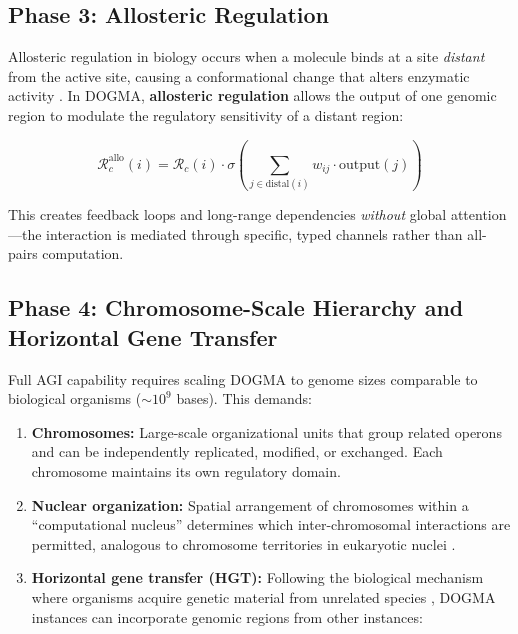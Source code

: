 \subsection{Phase 3: Allosteric Regulation}
\label{sec:allosteric}

Allosteric regulation in biology occurs when a molecule binds at a site \emph{distant} from the active site, causing a conformational change that alters enzymatic activity \citep{monod1965}. In DOGMA, \textbf{allosteric regulation} allows the output of one genomic region to modulate the regulatory sensitivity of a distant region:

\begin{equation}
\mathcal{R}_c^{\text{allo}}(i) = \mathcal{R}_c(i) \cdot \sigma\!\left(\sum_{j \in \text{distal}(i)} w_{ij} \cdot \text{output}(j)\right)
\label{eq:allosteric}
\end{equation}

This creates feedback loops and long-range dependencies \emph{without} global attention---the interaction is mediated through specific, typed channels rather than all-pairs computation.

\subsection{Phase 4: Chromosome-Scale Hierarchy and Horizontal Gene Transfer}
\label{sec:chromosome}

Full AGI capability requires scaling DOGMA to genome sizes comparable to biological organisms ($\sim\!10^9$ bases). This demands:

\begin{enumerate}[leftmargin=1.8em]
  \item \textbf{Chromosomes:} Large-scale organizational units that group related operons and can be independently replicated, modified, or exchanged. Each chromosome maintains its own regulatory domain.

  \item \textbf{Nuclear organization:} Spatial arrangement of chromosomes within a ``computational nucleus'' determines which inter-chromosomal interactions are permitted, analogous to chromosome territories in eukaryotic nuclei \citep{cremer2001}.

  \item \textbf{Horizontal gene transfer (HGT):} Following the biological mechanism where organisms acquire genetic material from unrelated species \citep{keeling2008}, DOGMA instances can incorporate genomic regions from other instances:
\end{enumerate}


